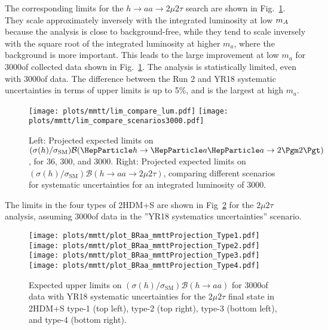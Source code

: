 The corresponding limits for the $h \to aa \to 2\mu2\tau$ search are shown in Fig.~\ref{fig:mmtt_proj}.
They scale approximately inversely with the integrated luminosity at low $m_{A}$ because the
analysis is close to background-free, while they tend to scale inversely with the square root of the integrated luminosity at higher $m_a$, where the background is more important. This leads to the large improvement at low $m_a$ for 3000\fbinv of collected data shown in Fig.~\ref{fig:mmtt_proj}. The analysis is statistically limited, even with 3000\fbinv of data. The difference between the Run 2 and YR18 systematic uncertainties in terms of upper limits
is up to 5\%, and is the largest at high $m_a$.

\begin{figure*}[hbpt]
\centering
        \texttt{[image: plots/mmtt/lim\_compare\_lum.pdf]}
        \texttt{[image: plots/mmtt/lim\_compare\_scenarios3000.pdf]}\\
    \caption{Left: Projected expected limits on $(\sigma(h)/\sigma_{\textrm{SM}}) \mathcal{B}(\processmmtt)$, for 36, 300, and 3000\fbinv. Right: Projected expected limits on $(\sigma(h)/\sigma_{\textrm{SM}}) \mathcal{B}(h\to aa \to 2\mu2\tau)$, comparing different scenarios for systematic uncertainties for an integrated luminosity of 3000\fbinv.}
    \label{fig:mmtt_proj}
\end{figure*}

The limits in the four types of 2HDM+S are shown
in Fig~\ref{fig:summary_mmtt} for the $2\mu 2\tau$ analysis, assuming 3000\fbinv of data in the ''YR18 systematics uncertainties'' scenario.

\begin{figure*}[hbpt]
\centering
        \texttt{[image: plots/mmtt/plot\_BRaa\_mmttProjection\_Type1.pdf]}
        \texttt{[image: plots/mmtt/plot\_BRaa\_mmttProjection\_Type2.pdf]} \\
        \texttt{[image: plots/mmtt/plot\_BRaa\_mmttProjection\_Type3.pdf]}
        \texttt{[image: plots/mmtt/plot\_BRaa\_mmttProjection\_Type4.pdf]}
    \caption{Expected upper limits on $(\sigma(h)/\sigma_{\textrm{SM}})\mathcal{B}(h\to aa)$ for 3000\fbinv of data with YR18 systematic uncertainties for the $2\mu 2\tau$ final state in 2HDM+S type-1 (top left), type-2 (top right), type-3 (bottom left), and type-4 (bottom right).}
    \label{fig:summary_mmtt}
\end{figure*}



